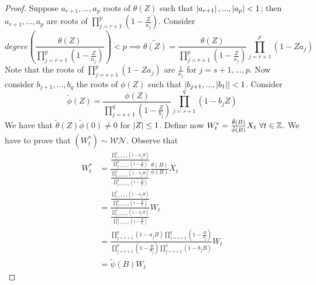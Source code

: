 
\begin{proof}
    Suppose $a_{r+1},...,a_p$ roots of $\theta(Z)$ such that $\left|a_{r+1}\right|,...,\left|a_p\right|<1$; then $a_{r+1},...,a_p$ are roots of $\prod_{j=r+1}^p\left(1-\frac{Z}{a_j}\right)$. Consider
    \[
        degree\left(\frac{\theta(Z)}{\prod_{j=r+1}^p\left(1-\frac{Z}{a_j}\right)}\right)<p\implies\tilde{\theta(Z)}=\frac{\theta(Z)}{\prod_{j=r+1}^p\left(1-\frac{Z}{a_j}\right)}\prod_{j=r+1}^p(1-Za_j)
    \]
    Note that the roots of $\prod_{j=s+1}^p(1-Za_j)$ are $\frac{1}{a_j}$ for $j=s+1,...,p$. Now consider $b_{j+1},...,b_q$ the roots of $\phi(Z)$ such that $\left|b_{j+1},...,\left|b_1\right|\right|<1$. Consider
    \[
        \tilde{\phi}(Z)=\frac{\phi(Z)}{\prod_{j=s+1}^q\left(1-\frac{Z}{b_j}\right)}\prod_{j=s+1}^q\left(1-b_jZ\right)
    \]
    We have that $\tilde{\theta}(Z)\tilde{\phi}(0)\ne0$ for $\left|Z\right|\le1$. Define now $W_t^*=\frac{\tilde{\theta}(B)}{\tilde{\phi}(B)}X_t\ \forall t\in\Z$. We have to prove that $(W_t^*)\sim \mathcal{WN}$. Observe that
    \begin{equation*}
        \begin{split}
            W_t^*&=\frac{\frac{\prod_{j=r+1}^p(1-a_jB)}{\prod_{j=r+1}^p\left(1-\frac{B}{a_j}\right)}}{\frac{\prod_{j=s+1}^q(1-b_jB)}{\prod_{j=s+1}^q\left(1-\frac{B}{b_j}\right)}}\frac{\theta(B)}{\phi(B)}X_t\\
            &=\frac{\frac{\prod_{j=r+1}^p(1-a_jB)}{\prod_{j=r+1}^p\left(1-\frac{B}{a_j}\right)}}{\frac{\prod_{j=s+1}^q(1-b_jB)}{\prod_{j=s+1}^q\left(1-\frac{B}{b_j}\right)}}W_t\\
            &=\frac{\prod_{j=r+1}^p(1-a_jB)\prod_{j=s+1}^q\left(1-\frac{B}{b_j}\right)}{\prod_{j=r+1}^p\left(1-\frac{B}{a_j}\right)\prod_{j=s+1}^q(1-b_jB)}W_t\\
            &=\tilde{\psi}(B)W_t
        \end{split}
    \end{equation*}

\end{proof}
